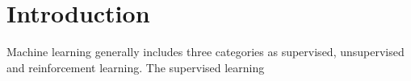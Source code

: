 \section{Introduction}

Machine learning generally includes three categories as supervised, unsupervised and reinforcement learning. The supervised learning 
